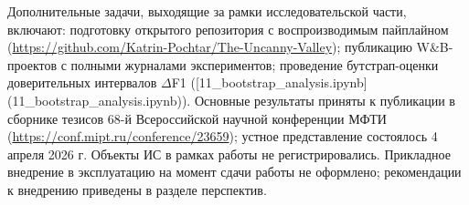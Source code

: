 \documentclass[a4paper, 12pt, oneside, openany]{article}
\begin{document}
Дополнительные задачи, выходящие за рамки исследовательской части, включают: подготовку открытого репозитория с воспроизводимым пайплайном (\url{https://github.com/Katrin-Pochtar/The-Uncanny-Valley}); публикацию W\&B-проектов с полными журналами экспериментов; проведение бутстрап-оценки доверительных интервалов $\Delta$F1 ([11\_bootstrap\_analysis.ipynb](11\_bootstrap\_analysis.ipynb)). Основные результаты приняты к публикации в сборнике тезисов 68-й Всероссийской научной конференции МФТИ (\url{https://conf.mipt.ru/conference/23659}); устное представление состоялось 4 апреля 2026 г. Объекты ИС в рамках работы не регистрировались. Прикладное внедрение в эксплуатацию на момент сдачи работы не оформлено; рекомендации к внедрению приведены в разделе перспектив.


\end{document}
